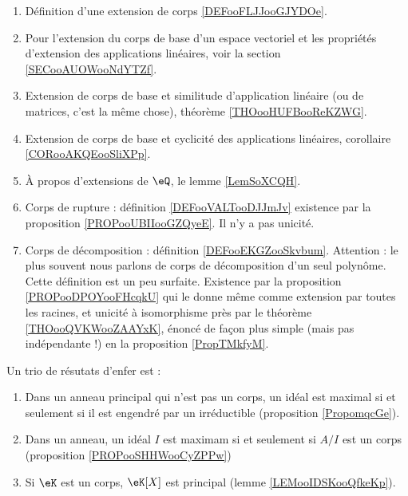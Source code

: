 
 \label{THEMEooZYKFooQXhiPD}
    \begin{enumerate}
        \item
            Définition d'une extension de corps \ref{DEFooFLJJooGJYDOe}.
        \item
            Pour l'extension du corps de base d'un espace vectoriel et les propriétés d'extension des applications linéaires, voir la section \ref{SECooAUOWooNdYTZf}.
        \item
            Extension de corps de base et similitude d'application linéaire (ou de matrices, c'est la même chose), théorème \ref{THOooHUFBooReKZWG}.
        \item
            Extension de corps de base et cyclicité des applications linéaires, corollaire \ref{CORooAKQEooSliXPp}.
        \item 
            À propos d'extensions de \( \eQ\), le lemme \ref{LemSoXCQH}.
        \item
            Corps de rupture : définition \ref{DEFooVALTooDJJmJv} existence par la proposition \ref{PROPooUBIIooGZQyeE}. Il n'y a pas unicité.
        \item
            Corps de décomposition : définition \ref{DEFooEKGZooSkvbum}. Attention : le plus souvent nous parlons de corps de décomposition d'un seul polynôme. Cette définition est un peu surfaite. Existence par la proposition \ref{PROPooDPOYooFHcqkU} qui le donne même comme extension par toutes les racines, et unicité à isomorphisme près par le théorème \ref{THOooQVKWooZAAYxK}, énoncé de façon plus simple (mais pas indépendante !) en la proposition \ref{PropTMkfyM}.
    \end{enumerate}

Un trio de résutats d'enfer est :
\begin{enumerate}
    \item
        Dans un anneau principal qui n'est pas un corps, un idéal est maximal si et seulement si il est engendré par un irréductible (proposition \ref{PropomqcGe}).
    \item
        Dans un anneau, un idéal \( I\) est maximam si et seulement si \( A/I\) est un corps (proposition \ref{PROPooSHHWooCyZPPw})
    \item
        Si \( \eK\) est un corps, \( \eK[X]\) est principal (lemme \ref{LEMooIDSKooQfkeKp}).
\end{enumerate}


